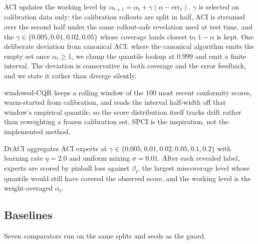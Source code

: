 \documentclass{article}
\begin{document}
ACI updates the working level by $\alpha_{t+1} = \alpha_t + \gamma(\alpha -
\mathrm{err}_t)$. $\gamma$ is selected on calibration data only: the calibration
rollouts are split in half, ACI is streamed over the second half under the same
rollout-safe revelation used at test time, and the $\gamma \in \{0.005, 0.01, 0.02,
0.05\}$ whose coverage lands closest to $1{-}\alpha$ is kept. One deliberate deviation
from canonical ACI: where the canonical algorithm emits the empty set once $\alpha_t
\geq 1$, we clamp the quantile lookup at 0.999 and emit a finite interval. The
deviation is conservative in both coverage and the error feedback, and we state it
rather than diverge silently.

windowed-CQR keeps a rolling window of the 100 most recent conformity scores,
warm-started from calibration, and reads the interval half-width off that window's
empirical quantile, so the score distribution itself tracks drift rather than
reweighting a frozen calibration set. SPCI \cite{xu2023spci} is the inspiration, not
the implemented method.

DtACI aggregates ACI experts at $\gamma \in \{0.005, 0.01, 0.02, 0.05, 0.1, 0.2\}$
with learning rate $\eta = 2.0$ and uniform mixing $\sigma = 0.01$. After each revealed
label, experts are scored by pinball loss against $\beta_t$, the largest miscoverage
level whose quantile would still have covered the observed score, and the working level
is the weight-averaged $\alpha_t$.

\subsection{Baselines}
\label{app:baselines}

Seven comparators run on the same splits and seeds as the guard.
\end{document}

